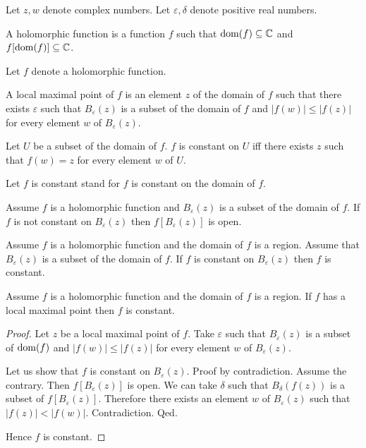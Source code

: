 \documentclass[english]{article}
\newcommand{\Ball}[2]{B_{#1}(#2)}
\begin{document}
\begin{forthel}
Let $z, w$ denote complex numbers.
Let $\varepsilon, \delta$ denote positive real numbers.

\begin{signature}
  A holomorphic function is a function $f$ such that $\operatorname{dom}(f) \subseteq \mathbb{C}$
  and $f[\operatorname{dom}(f)] \subseteq \mathbb{C}$.
\end{signature}

Let $f$ denote a holomorphic function.

\begin{definition}
  A local maximal point of $f$ is an element $z$ of the domain of $f$ such that there exists
  $\varepsilon$ such that $\Ball{\varepsilon}{z}$ is a subset of the domain of $f$ and
  $|f(w)| \leq |f(z)|$ for every element $w$ of $\Ball{\varepsilon}{z}$.
\end{definition}

\begin{definition}
  Let $U$ be a subset of the domain of $f$. $f$ is constant on $U$ iff there exists
  $z$ such that $f(w) = z$ for every element $w$ of $U$.
\end{definition}

Let $f$ is constant stand for $f$ is constant on the domain of $f$.

\begin{axiom}
  Assume $f$ is a holomorphic function and $\Ball{\varepsilon}{z}$ is a subset of the domain of $f$.
  If $f$ is not constant on $\Ball{\varepsilon}{z}$
  then $f[\Ball{\varepsilon}{z}]$ is open.
\end{axiom}

\begin{axiom}
  Assume $f$ is a holomorphic function and the domain of $f$ is a region.
  Assume that $\Ball{\varepsilon}{z}$ is a subset of the domain of $f$.
  If $f$ is constant on $\Ball{\varepsilon}{z}$ then $f$ is constant.
\end{axiom}

\begin{proposition}
  Assume $f$ is a holomorphic function and the domain of $f$ is a region.
  If $f$ has a local maximal point then $f$ is constant.
\end{proposition}
\begin{proof}
  Let $z$ be a local maximal point of $f$.
  Take $\varepsilon$ such that
  $\Ball{\varepsilon}{z}$ is a subset of $\operatorname{dom}(f)$
  and $|f(w)| \leq |f(z)|$ for every element $w$ of $\Ball{\varepsilon}{z}$.

  Let us show that $f$ is constant on $\Ball{\varepsilon}{z}$.\newline
  Proof by contradiction.
    Assume the contrary.
    Then $f[\Ball{\varepsilon}{z}]$ is open.
    We can take $\delta$ such that
    $\Ball{\delta}{f(z)}$ is a subset of $f[\Ball{\varepsilon}{z}]$.
    Therefore there exists an element $w$ of $\Ball{\varepsilon}{z}$ such that
    $|f(z)| < |f(w)|$.
    Contradiction.
  Qed.

  Hence $f$ is constant.
\end{proof}
\end{forthel}
\end{document}
